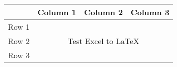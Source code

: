 
    \begin{tabular}{rrrr}
    \hline
          & Column 1 & Column 2 & Column 3 \\
    \hline
    Row 1 & \multicolumn{3}{c}{\multirow{3}[0]{*}{Test Excel to LaTeX}} \\
    Row 2 & \multicolumn{3}{c}{}  \\
    Row 3 & \multicolumn{3}{c}{}  \\
    \hline
    \end{tabular}%

